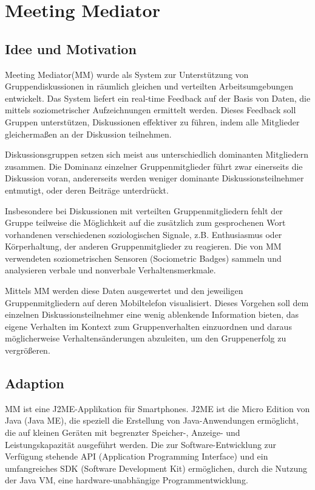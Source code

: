\section{Meeting Mediator}

\subsection{Idee und Motivation}
Meeting Mediator(MM) \cite{KimChaHolPent2008} wurde als System zur
Un\-ter\-stütz\-ung von Gruppendiskussionen in räumlich gleichen und verteilten
Arbeitsumgebungen entwickelt. Das System liefert ein real-time Feedback auf der
Basis von Daten, die mittels soziometrischer Aufzeichnungen ermittelt werden.
Dieses Feedback soll Gruppen unterstützen, Diskussionen effektiver zu führen,
indem alle Mitglieder gleichermaßen an der Diskussion teilnehmen.

Diskussionsgruppen setzen sich meist aus unterschiedlich dominanten Mitgliedern
zusammen. Die Dominanz einzelner Gruppenmitglieder führt zwar einerseits die
Diskussion voran, andererseits werden weniger dominante Diskussionsteilnehmer 
entmutigt, oder deren Beiträge un\-ter\-drückt.

Insbesondere bei Diskussionen mit verteilten Gruppenmitgliedern fehlt der
Gruppe teilweise die Möglichkeit auf die zusätzlich zum gesprochenen Wort
vorhandenen verschiedenen soziologischen Signale, z.B. Enthusiasmus oder
Kör\-per\-hal\-tung, der anderen Gruppenmitglieder zu reagieren.
Die von MM verwendeten soziometrischen Sensoren (Sociometric Badges)
\cite{MITbadge} sammeln und analysieren verbale und nonverbale
Verhaltensmerkmale.

Mittels MM werden diese Daten ausgewertet und den jeweiligen Gruppenmitgliedern
auf deren Mobiltelefon visualisiert. Dieses Vorgehen soll dem einzelnen
Diskussionsteilnehmer eine wenig ablenkende Information bieten, das eigene
Verhalten im Kontext zum Gruppenverhalten einzuordnen und daraus möglicherweise
Ver\-hal\-tens\-än\-de\-run\-gen abzuleiten, um den Gruppenerfolg zu
vergrößeren.

\subsection{Adaption}

MM ist eine J2ME-Applikation für Smartphones. J2ME \cite{J2ME} ist die Micro
Edition von Java (Java ME), die speziell die Erstellung von Java-Anwendungen
ermöglicht, die auf kleinen Geräten mit begrenzter Speicher-, Anzeige- und
Leistungskapazität ausgeführt werden. Die zur Software-Ent\-wick\-lung zur
Verfügung stehende API (Application Programming Interface) und ein umfangreiches
SDK (Software Development Kit) ermöglichen, durch die Nutzung der Java VM, eine
hardware-un\-ab\-hän\-gi\-ge Programmentwicklung.

